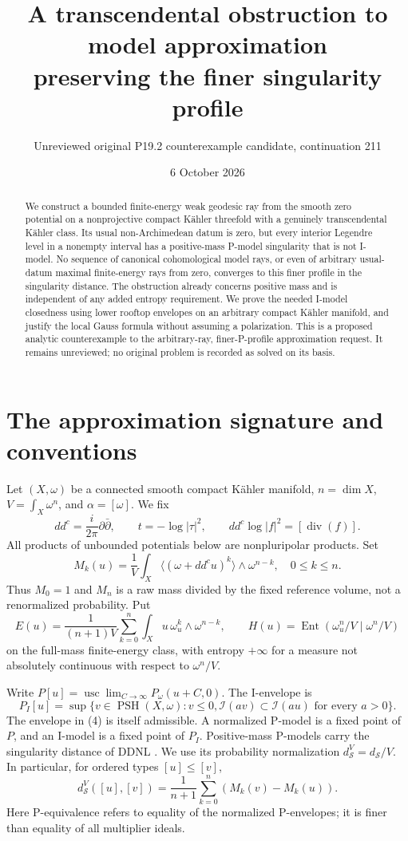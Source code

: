 \documentclass[11pt]{article}
\title{A transcendental obstruction to model approximation\protect\\ preserving the finer singularity profile}
\author{Unreviewed original P19.2 counterexample candidate, continuation 211}
\date{6 October 2026}
\newcommand{\PSH}{\operatorname{PSH}}
\newcommand{\MI}{\mathcal I}
\newcommand{\ddc}{dd^c}
\newcommand{\ds}{d_{\mathcal S}}
\begin{document}
\maketitle
\begin{abstract}
We construct a bounded finite-energy weak geodesic ray from the smooth
zero potential on a nonprojective compact K\"ahler threefold with a
genuinely transcendental K\"ahler class. Its usual non-Archimedean datum
is zero, but every interior Legendre level in a nonempty interval has a
positive-mass P-model singularity that is not I-model. No sequence of
canonical cohomological model rays, or even of arbitrary usual-datum
maximal finite-energy rays from zero, converges to this finer profile
in the singularity distance. The obstruction already concerns positive
mass and is independent of any added entropy requirement. We prove the
needed I-model closedness using lower rooftop envelopes on an arbitrary
compact K\"ahler manifold, and justify the local Gauss formula without
assuming a polarization. This is a proposed analytic counterexample to
the arbitrary-ray, finer-P-profile approximation request. It remains
unreviewed; no original problem is recorded as solved on its basis.
\end{abstract}

\section{The approximation signature and conventions}
Let $(X,\omega)$ be a connected smooth compact K\"ahler manifold,
$n=\dim X$, $V=\int_X\omega^n$, and $\alpha=[\omega]$. We fix
\[
 \ddc=\frac{i}{2\pi}\partial\bar\partial,
 \qquad t=-\log|\tau|^2,
 \qquad \ddc\log|f|^2=[\operatorname{div}(f)].                 \tag{1}
\]
All products of unbounded potentials below are nonpluripolar products.
Set
\[
 M_k(u)=\frac1V\int_X\langle(\omega+\ddc u)^k\rangle
                      \wedge\omega^{n-k},\quad 0\le k\le n.
                                                               \tag{2}
\]
Thus $M_0=1$ and $M_n$ is a raw mass divided by the fixed reference
volume, not a renormalized probability. Put
\[
 E(u)=\frac1{(n+1)V}\sum_{k=0}^n
     \int_X u\,\omega_u^k\wedge\omega^{n-k},\qquad
 H(u)=\operatorname{Ent}(\omega_u^n/V\mid\omega^n/V)
                                                               \tag{3}
\]
on the full-mass finite-energy class, with entropy $+\infty$ for a
measure not absolutely continuous with respect to $\omega^n/V$.

Write $P[u]=\operatorname{usc}\lim_{C\to\infty}P_\omega(u+C,0)$.
The I-envelope is
\[
 P_I[u]=\sup\{v\in\PSH(X,\omega):v\le0,
                 \MI(av)\subset\MI(au)\text{ for every }a>0\}.
                                                               \tag{4}
\]
The envelope in (4) is itself admissible. A normalized P-model is a
fixed point of $P$, and an I-model is a fixed point of $P_I$.
Positive-mass P-models carry the singularity distance of DDNL
\cite{DDNL}. We use its probability normalization $\ds^V=\ds/V$.
In particular, for ordered types $[u]\le[v]$,
\[
 \ds^V([u],[v])=\frac1{n+1}\sum_{k=0}^n(M_k(v)-M_k(u)).        \tag{5}
\]
Here P-equivalence refers to equality of the normalized P-envelopes;
it is finer than equality of all multiplier ideals.
\end{document}
